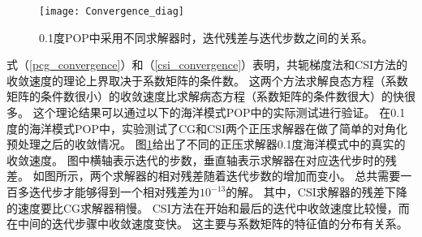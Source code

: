 \begin {figure}[!ht]
\vspace{10pt}
\centering
\texttt{[image: Convergence\_diag]}
\caption[] {0.1度POP中采用不同求解器时，迭代残差与迭代步数之间的关系。\label{fig:convergence_diag}}
\end{figure}
式（\ref{pcg_convergence}）和（\ref{csi_convergence}）表明，共轭梯度法和CSI方法的收敛速度的理论上界取决于系数矩阵的条件数。 
这两个方法求解良态方程（系数矩阵的条件数很小）的收敛速度比求解病态方程（系数矩阵的条件数很大）的快很多。
这个理论结果可以通过以下的海洋模式POP中的实际测试进行验证。 
在0.1度的海洋模式POP中，实验测试了CG和CSI两个正压求解器在做了简单的对角化预处理之后的收敛情况。
图\ref{fig:convergence_diag}给出了不同的正压求解器0.1度海洋模式中的真实的收敛速度。
图中横轴表示迭代的步数，垂直轴表示求解器在对应迭代步时的残差。 
如图所示，两个求解器的相对残差随着迭代步数的增加而变小。
总共需要一百多迭代步才能够得到一个相对残差为$10^{-13}$的解。
其中，CSI求解器的残差下降的速度要比CG求解器稍慢。
CSI方法在开始和最后的迭代中收敛速度比较慢，而在中间的迭代步骤中收敛速度变快。
这主要与系数矩阵的特征值的分布有关系。 


